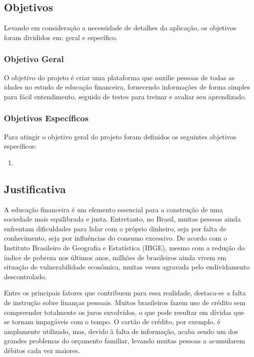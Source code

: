 \documentclass[
	article,			%
	12pt,				%
	oneside,			%
	a4paper,			%
	english,			%
	brazil,				%
	sumario=tradicional
	]{abntex2}
\begin{document}
\subsection{Objetivos}
    Levando em consideração a necessidade de detalhes da aplicação, os objetivos foram divididos em: geral e específico.
\subsubsection{Objetivo Geral}
    O objetivo do projeto é criar uma plataforma que auxilie pessoas de todas as idades no estudo de educação financeira, fornecendo informações de forma simples para fácil entendimento, seguido de testes para treinar e avaliar seu aprendizado.
\subsubsection{Objetivos Específicos}
    Para atingir o objetivo geral do projeto foram definidos os seguintes objetivos específicos:
        \begin{enumerate}[label=\alph*)]
            \item 
        \end{enumerate}
       
\subsection{Justificativa}    
	    A educação financeira é um elemento essencial para a construção de uma sociedade mais equilibrada e justa. Entretanto, no Brasil, muitas pessoas ainda enfrentam dificuldades para lidar com o próprio dinheiro, seja por falta de conhecimento, seja por influências do consumo excessivo. De acordo com o Instituto Brasileiro de Geografia e Estatística (IBGE), mesmo com a redução do índice de pobreza nos últimos anos, milhões de brasileiros ainda vivem em situação de vulnerabilidade econômica, muitas vezes agravada pelo endividamento descontrolado.

    Entre os principais fatores que contribuem para essa realidade, destaca-se a falta de instrução sobre finanças pessoais. Muitos brasileiros fazem uso de crédito sem compreender totalmente os juros envolvidos, o que pode resultar em dívidas que se tornam impagáveis com o tempo. O cartão de crédito, por exemplo, é amplamente utilizado, mas, devido à falta de informação, acaba sendo um dos grandes problemas do orçamento familiar, levando muitas pessoas a acumularem débitos cada vez maiores.
\end{document}
